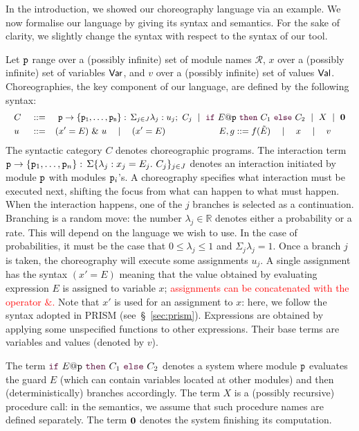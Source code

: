 In the introduction, we showed our choreography language via an
example. We now formalise our language by giving its syntax and
semantics. For the sake of clarity, we slightly change the syntax with
respect to the syntax of our tool.

%
Let $\mathtt{p}$ range over a (possibly infinite) set of module names
$\mathcal R$, $x$ over a (possibly infinite) set of variables $\mathsf{Var}$,
and $v$ over a (possibly infinite) set of values $\mathsf{Val}$.
%
Choreographies, the key component of our language, are defined by the
following syntax:
%
\begin{displaymath}\small
  \begin{array}{llllllllllll}
    C \ & ::= & \
      \interact{p}{\role p_1,\ldots,\role p_n}
      \ \mid\
      \ifTE {E}{p}{C_1}{C_2}
      \ \mid\ X \ \mid\  \CEnd
    \\[1mm]
    u     & ::=  & (x' = E)\ \&\ u \quad\mid\quad    (x' = E)
    \qquad\qquad\qquad
    E, g     ::=        f(\tilde E)\quad\mid\quad x\quad\mid\quad v

  \end{array}
\end{displaymath}
The syntactic category $C$ denotes choreographic programs. The
interaction term
$\mathtt{p}\rightarrow \{\mathtt{p}_1,\ldots,\mathtt{p}_n\}:\,\Sigma\{\lambda_j: x_j=E_j.\ C_j\}_{j\in J}$ denotes an
interaction initiated by module $\mathtt{p}$ with modules $\mathtt{p}_i$'s. A choreography specifies what interaction must be executed
next, shifting the focus from what can happen to what must
happen. When the interaction happens, one of the $j$ branches is
selected as a continuation. Branching is a random move: the number
$\lambda_j\in\mathbb R$ denotes either a probability or a rate. This
will depend on the language we wish to use. In the case of
probabilities, it must be the case that $0\leq\lambda_j\leq 1$ and
$\Sigma_j\lambda_j=1$. Once a branch $j$ is taken, the choreography
will execute some assignments $u_j$. A single assignment has the
syntax $(x' = E)$ meaning that the value obtained by evaluating
expression $E$ is assigned to variable $x$; \textcolor{red}{assignments can be concatenated with the operator $\&$.} 
Note that $x'$ is used for
an assignment to $x$: here, we follow the syntax adopted in PRISM
(see~\S~\ref{sec:prism}). Expressions are obtained by applying some
unspecified functions to other expressions. Their base terms are
variables and values (denoted by $v$).
%

The term $\ifTE {E}{p}{C_1}{C_2}$ denotes a system where module
  $\mathtt{p}$ evaluates the guard $E$ (which can contain variables
  located at other modules) and then (deterministically) branches
  accordingly.  The term $X$ is a (possibly recursive) procedure call:
  in the semantics, we assume that such procedure names are defined
  separately.  The term $\mathbf{0}$ denotes the system finishing its
  computation.

